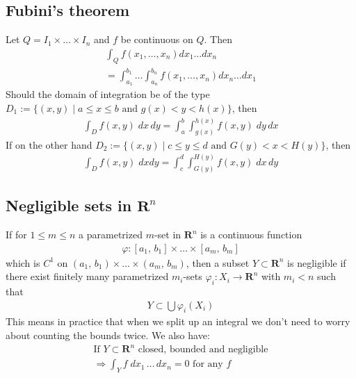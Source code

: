 \documentclass[8pt]{extarticle}
\newcommand{\R}{{\mathbb R}}
\newcommand{\X}{{\mathcal X}}
\newcommand{\ra}{{\rightarrow}}
\newcommand{\Ra}{{\Rightarrow}}
\def\R{\mathbf{R}}
\def\X{X}
\begin{document}
\begin{multicols*}{3}
  \subsection{Fubini's theorem}
  Let $Q = I_1 \times \dots \times I_n$ and $f$ be continuous on $Q$. Then
  \begin{align*}
    \int_Q f(x_1, \dots, x_n) dx_1 \dots dx_n \\
    =  \int_{a_1}^{b_1} \dots \int_{a_n}^{b_n} f(x_1, \dots, x_n) dx_n \dots dx_1
  \end{align*}
  Should the domain of integration be of the type $D_1 := \{ (x, y) \;|\; a \leq x \leq b \text{ and } g(x) < y < h(x) \}$,
  then
  \begin{align*}
    \int_D f(x, y) \; dx \, dy = \int_a^b \int_{g(x)}^{h(x)} f(x, y) \; dy \, dx
  \end{align*}
  If on the other hand $D_2 := \{(x, y) \;|\; c \leq y \leq d \text{ and } G(y) < x < H(y)\}$,
  then
  \begin{align*}
    \int_D f(x, y) \; dx dy = \int_c^d \int_{G(y)}^{H(y)} f(x, y) \; dx \, dy
  \end{align*}

  \subsection{Negligible sets in $\R^n$}
  If for $1 \leq m \leq n$ a parametrized $m$-set
  in $\R^n$ is a continuous function
  \begin{align*}
    \varphi: [a_1,\, b_1] \times \dots \times [a_m,\, b_m]
  \end{align*}
  which is $C^1$ on $(a_1,\, b_1) \times \dots \times (a_m,\, b_m)$,
  then a subset $Y \subset \R^n$ is negligible if there exist finitely
  many parametrized $m_i$-sets $\varphi_i: \X_i \ra \R^n$ with $m_i < n$ such that
  \begin{align*}
    Y \subset \bigcup \varphi_i (\X_i)
  \end{align*}
  This means in practice that when we split up an
  integral we don't need to worry about counting the bounds twice.
  We also have:
  \begin{align*}
    \text{If } Y \subset \R^n \text{ closed, bounded and negligible} \\
    \Ra \int_Y f \; dx_1 \, \dots \, dx_n = 0 \text{ for any } f
  \end{align*}

\end{multicols*}
\end{document}
